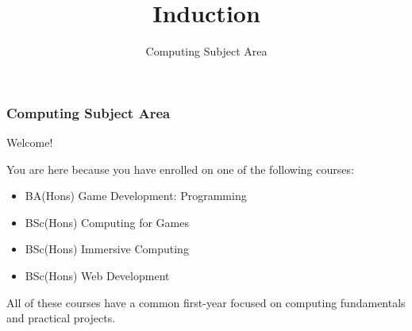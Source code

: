 \usepackage{../../beamerthemeFalmouthGamesAcademy}
\usepackage{multimedia}
\graphicspath{ {../../} }


\usepackage[normalem]{ulem}
\usepackage{wasysym}
\usepackage[T1]{fontenc}
\usepackage{pdfpages}

\usetikzlibrary{arrows,automata}





\title{Induction}
\subtitle{Computing Subject Area}

\frame{\titlepage} 

\begin{frame}
	\frametitle{Computing Subject Area}
	
	Welcome!
	
	\vspace{1em}
	
	You are here because you have enrolled on one of the following courses:
	
	\vspace{0.2em}
	
	\begin{itemize}
		\item BA(Hons) Game Development: Programming
		\item BSc(Hons) Computing for Games
		\item BSc(Hons) Immersive Computing
		\item BSc(Hons) Web Development
	\end{itemize}
	
	\vspace{1em}
	
	All of these courses have a common first-year focused on computing fundamentals and practical projects.

\end{frame}

